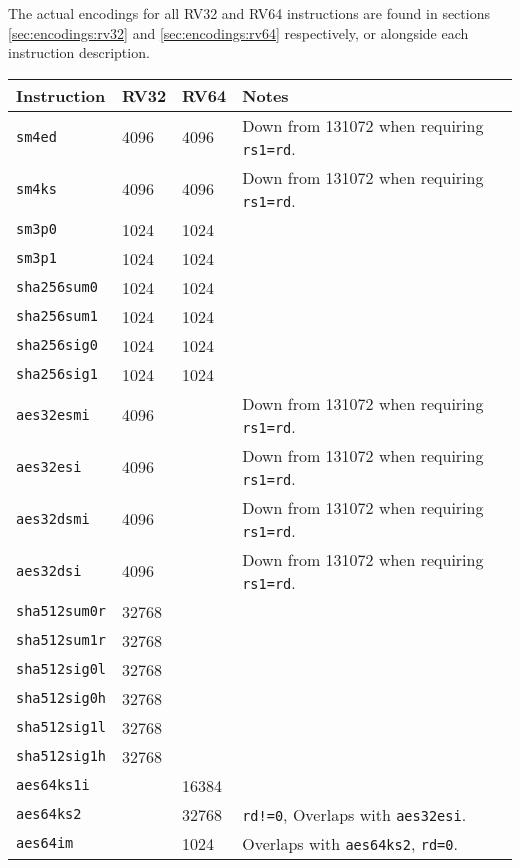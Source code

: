 The actual encodings for all RV32 and RV64 instructions are
found in sections
\ref{sec:encodings:rv32}
and
\ref{sec:encodings:rv64}
respectively, or alongside each instruction description.

\begin{table}[]
\centering
\begin{tabular}{@{}llll@{}}
\toprule
Instruction      & RV32   & RV64   & Notes \\ \midrule
{\tt       sm4ed}& 4096   & 4096   & Down from 131072 when requiring {\tt rs1=rd}. \\
{\tt       sm4ks}& 4096   & 4096   & Down from 131072 when requiring {\tt rs1=rd}. \\
{\tt       sm3p0}& 1024   & 1024   &           \\
{\tt       sm3p1}& 1024   & 1024   &           \\
{\tt  sha256sum0}& 1024   & 1024   &           \\
{\tt  sha256sum1}& 1024   & 1024   &           \\
{\tt  sha256sig0}& 1024   & 1024   &           \\
{\tt  sha256sig1}& 1024   & 1024   &           \\
{\tt   aes32esmi}& 4096   &        & Down from 131072 when requiring {\tt rs1=rd}. \\
{\tt    aes32esi}& 4096   &        & Down from 131072 when requiring {\tt rs1=rd}. \\
{\tt   aes32dsmi}& 4096   &        & Down from 131072 when requiring {\tt rs1=rd}. \\
{\tt    aes32dsi}& 4096   &        & Down from 131072 when requiring {\tt rs1=rd}. \\
{\tt sha512sum0r}& 32768  &        &           \\
{\tt sha512sum1r}& 32768  &        &           \\
{\tt sha512sig0l}& 32768  &        &           \\
{\tt sha512sig0h}& 32768  &        &           \\
{\tt sha512sig1l}& 32768  &        &           \\
{\tt sha512sig1h}& 32768  &        &           \\
{\tt   aes64ks1i}&        & 16384  &           \\
{\tt    aes64ks2}&        & 32768  & {\tt rd!=0}, Overlaps with {\tt aes32esi}. \\
{\tt     aes64im}&        & 1024   & Overlaps with {\tt aes64ks2}, {\tt rd=0}.\\

\end{tabular}
\end{table}
